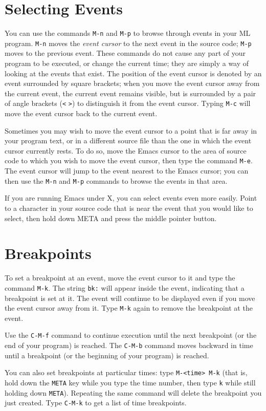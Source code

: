 \section{Selecting Events}
You can use the commands \verb'M-n' and \verb'M-p'
to browse through events in your ML
program.  \verb'M-n' moves the {\em event cursor} to the next event in the
source code; \verb'M-p' moves to the previous event.  These commands do not
cause any part of your program to be executed, or change the current
time; they are simply a way of looking at the events that exist.  The
position of the event cursor is denoted by an event surrounded by
square brackets; when you move the event cursor away from the current
event, the current event remains visible, but is surrounded by a pair
of angle brackets (\verb'<' \verb'>') to distinguish it from the event
cursor.  Typing \verb'M-c' will move the event cursor back to the
current event.

Sometimes you may wish to move the event cursor to a point that is far
away in your program text, or in a different source file than the one
in which the event cursor currently rests.  To do so, move the Emacs
cursor to the area of source code to which you wish to move the
event cursor, then
type the command \verb'M-e'.  The event cursor will jump to the event nearest
to the Emacs cursor; you can then use the \verb'M-n' and
\verb'M-p' commands to
browse the events in that area.

If you are running Emacs under X, you can select events even more
easily.  Point to a character in your source code that is near the
event that you would like to select, then hold down META and press the
middle pointer button.

\section{Breakpoints}
To set a breakpoint at an event, move the event cursor to it and type
the command \verb'M-k'.  The string \verb'bk:' will appear inside the event,
indicating that a breakpoint is set at it.  The event will continue to
be displayed even if you move the event cursor away from it.  Type \verb'M-k'
again to remove the breakpoint at the event.

Use the \verb'C-M-f' command to continue execution until the next breakpoint
(or the end of your program) is reached.  The \verb'C-M-b' command moves 
backward in time until a breakpoint (or the beginning of your program) is 
reached.

You can also set breakpoints at particular times: type
\verb'M-<time> M-k'
(that is, hold down the \verb'META' key while you type
the time number, then type \verb'k' while still holding down \verb'META').
Repeating the same command will delete the breakpoint
you just created.  Type \verb'C-M-k' to get a list of time breakpoints.

